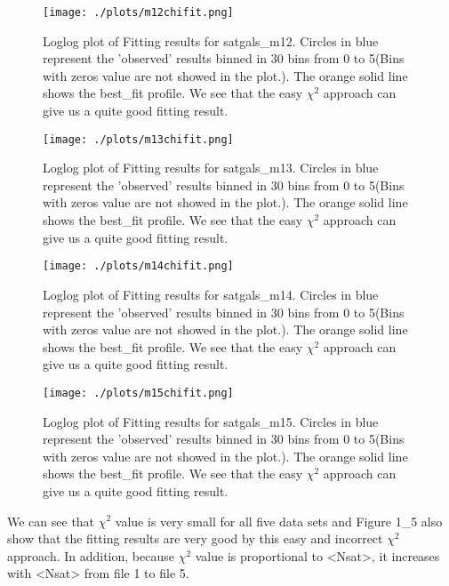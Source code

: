 \begin{figure}[h!]
  \centering
  \texttt{[image: ./plots/m12chifit.png]}
  \caption{Loglog plot of Fitting results for satgals\_m12. Circles in blue represent the 'observed' results binned in 30 bins from 0 to 5(Bins with zeros value are not showed in the plot.). The orange solid line shows the best\_fit profile. We see that the easy $\chi ^{2}$ approach can give us a quite good fitting result.}
  \label{fig2}
\end{figure}



\begin{figure}[h!]
  \centering
  \texttt{[image: ./plots/m13chifit.png]}
  \caption{Loglog plot of Fitting results for satgals\_m13. Circles in blue represent the 'observed' results binned in 30 bins from 0 to 5(Bins with zeros value are not showed in the plot.). The orange solid line shows the best\_fit profile. We see that the easy $\chi ^{2}$ approach can give us a quite good fitting result.}
  \label{fig3}
\end{figure}



\begin{figure}[h!]
  \centering
  \texttt{[image: ./plots/m14chifit.png]}
  \caption{Loglog plot of Fitting results for satgals\_m14. Circles in blue represent the 'observed' results binned in 30 bins from 0 to 5(Bins with zeros value are not showed in the plot.). The orange solid line shows the best\_fit profile. We see that the easy $\chi ^{2}$ approach can give us a quite good fitting result.}
  \label{fig4}
\end{figure}



\begin{figure}[h!]
  \centering
  \texttt{[image: ./plots/m15chifit.png]}
  \caption{Loglog plot of Fitting results for satgals\_m15. Circles in blue represent the 'observed' results binned in 30 bins from 0 to 5(Bins with zeros value are not showed in the plot.). The orange solid line shows the best\_fit profile. We see that the easy $\chi ^{2}$ approach can give us a quite good fitting result.}
  \label{fig5}
\end{figure}

We can see that $\chi ^{2}$ value is very small for all five data sets and Figure 1\_5 also show that the fitting results are very good by this easy and incorrect $\chi ^{2}$ approach. In addition, because $\chi ^{2}$ value is proportional to <Nsat>, it increases with <Nsat> from file 1 to file 5.
\clearpage

